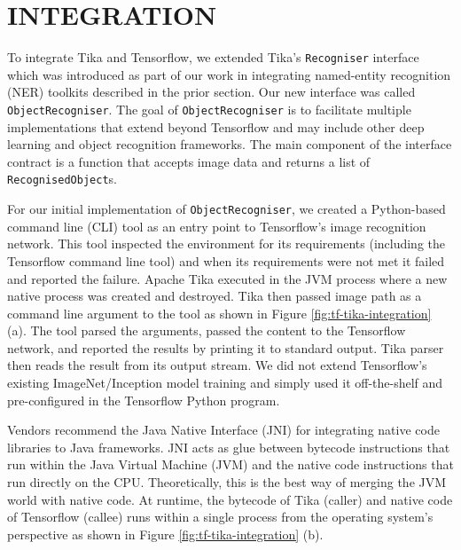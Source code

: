 
\section{INTEGRATION} \label{sec:integration}
To integrate Tika and Tensorflow, we extended Tika's \texttt{Recogniser} interface which was introduced as part of our work in integrating named-entity recognition (NER) toolkits described in the prior section. Our new interface was called \texttt{ObjectRecogniser}. The goal of \texttt{ObjectRecogniser} is to facilitate multiple implementations that extend beyond Tensorflow and may include other deep learning and object recognition frameworks. The main component of the interface contract is a function that accepts image data and returns a list of \texttt{RecognisedObject}s.

For our initial implementation of \texttt{ObjectRecogniser}, we created a Python-based command line (CLI) tool as an entry point to Tensorflow's image recognition network. This tool inspected the environment for its requirements (including the Tensorflow command line tool) and when its requirements were not met it failed and reported the failure. Apache Tika executed in the JVM process where a new native process was created and destroyed. Tika then passed image path as a command line argument to the tool as shown in Figure \ref{fig:tf-tika-integration} (a). The tool parsed the arguments, passed the content to the Tensorflow network, and reported the results by printing it to standard output. Tika parser then reads the result from its output stream. We did not extend Tensorflow's existing ImageNet/Inception model training and simply used it off-the-shelf and pre-configured in the Tensorflow Python program.

Vendors recommend the Java Native Interface (JNI) for integrating native code libraries to Java frameworks\cite{gordon1998essential}. JNI acts as glue between bytecode instructions that run within the Java Virtual Machine (JVM) and the native code instructions that run directly on the CPU. Theoretically, this is the best way of merging the JVM world with native code. At runtime, the bytecode of Tika (caller) and native code of Tensorflow (callee) runs within a single process from the operating system's perspective as shown in Figure \ref{fig:tf-tika-integration} (b).

